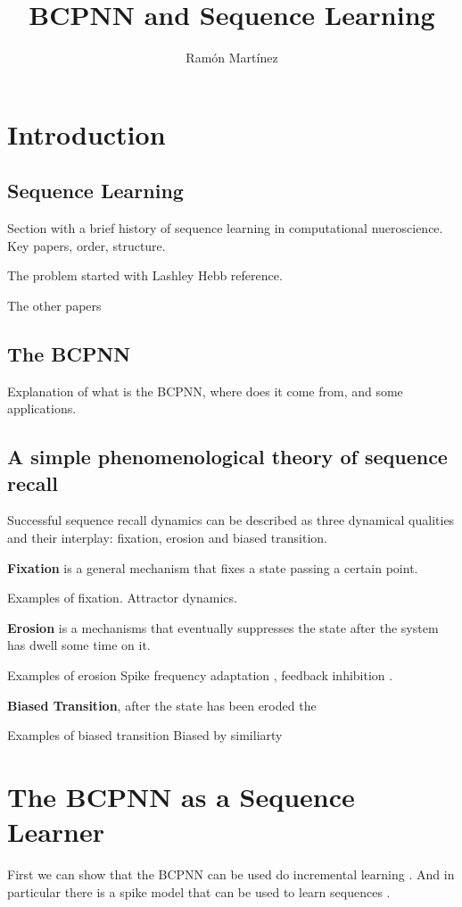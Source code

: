 \documentclass[10pt,a4paper]{article}
\author{Ram\'on Mart\'inez}
\title{BCPNN and Sequence Learning}
\begin{document}
\maketitle

\section{Introduction}

\subsection{Sequence Learning}
Section with a brief history of sequence learning in computational nueroscience. Key papers, order, structure. 


The problem started with Lashley \cite{lashley1951problem} Hebb reference. 

The other papers

\subsection{The BCPNN}
Explanation of what is the BCPNN, where does it come from, and some applications. 




\subsection{A simple phenomenological theory of sequence recall}
Successful sequence recall dynamics can be described as three dynamical qualities and their interplay: fixation, erosion and biased transition. 

\textbf{Fixation} is a general mechanism that fixes a state passing a certain point.

Examples of fixation. Attractor dynamics.

\textbf{Erosion} is a mechanisms that eventually suppresses the state after the system has dwell some time on it. 

Examples of erosion 
Spike frequency adaptation \cite{roach2016memory}, feedback inhibition \cite{recanatesi2017memory}. 

\textbf{Biased Transition}, after the state has been eroded the 

Examples of biased transition
Biased by similiarty \cite{recanatesi2017memory}


\section{The BCPNN as a Sequence Learner}
First we can show that the BCPNN can be used do incremental learning \cite{sandberg2002bayesian}. And in particular there is a spike model that can be used to learn sequences \cite{tully2016spike}. 
\end{document}
